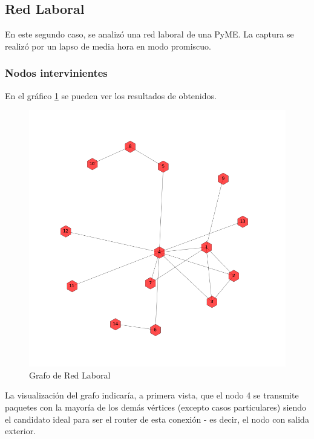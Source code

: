 \newpage
\subsection{Red Laboral}

En este segundo caso, se analiz\'o una red laboral de una PyME. La captura se realiz\'o por un lapso de media hora en modo promiscuo.

\subsubsection{Nodos intervinientes}
En el gr\'afico \ref{laboralGraph} se pueden ver los resultados de obtenidos.

\begin{figure}[h!]
    \centering                                                       
    \includegraphics[width=400pt]{img/laboralGraph.png}
    \caption{Grafo de Red Laboral}
    \label{laboralGraph}
\end{figure}

La visualizaci\'on del grafo indicar\'ia, a primera vista, que el nodo 4 se transmite paquetes con la mayor\'ia de los dem\'as v\'ertices (excepto casos particulares) siendo el candidato ideal para ser el router de esta conexi\'on - es decir, el nodo con salida exterior.\\

